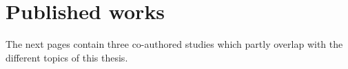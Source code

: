 \chapter{Published works}
\label{publishedworks}

The next pages contain three co-authored studies which partly overlap with the different topics of this thesis. 

\cleardoublepage


